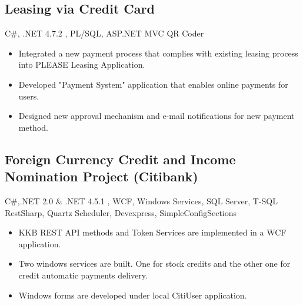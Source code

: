 \documentclass[1pt,a4paper,verdana]{moderncv} %
\begin{document}
\subsection{Leasing via Credit Card}
 {C\#, .NET 4.7.2 , PL/SQL, ASP.NET MVC}
 {QR Coder}
 {\begin{itemize}
		\item Integrated a new payment process that complies with existing leasing process into PLEASE Leasing Application.
		\item Developed  "Payment System" application that enables online payments for users.
		\item Designed new approval mechanism and e-mail notifications for new payment method.
\end{itemize}}


\subsection{Foreign Currency Credit and Income Nomination Project (Citibank)}
 {C\#,.NET 2.0 \& .NET 4.5.1 , WCF, Windows Services, SQL Server, T-SQL }
 {RestSharp, Quartz Scheduler, Devexpress, SimpleConfigSections}
 {\begin{itemize}
		\item KKB REST API methods and Token Services are implemented in a WCF application.
		\item Two windows services are built. One for stock credits and the other one for credit automatic payments delivery.
		\item Windows forms are developed under local CitiUser application.
\end{itemize}}
\end{document}
